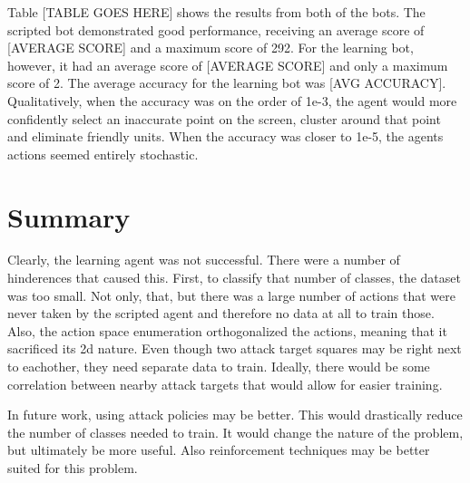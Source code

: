 \documentclass{amsart}
\theoremstyle{definition}
\begin{document}

Table [TABLE GOES HERE] shows the results from both of the bots.
The scripted bot demonstrated good performance, receiving an average score of [AVERAGE SCORE] and a maximum score of 292.
For the learning bot, however, it had an average score of [AVERAGE SCORE] and only a maximum score of 2.
The average accuracy for the learning bot was [AVG ACCURACY].
Qualitatively, when the accuracy was on the order of 1e-3, the agent would more confidently select an inaccurate point on the screen, cluster around that point and eliminate friendly units.
When the accuracy was closer to 1e-5, the agents actions seemed entirely stochastic.









\section{Summary}


Clearly, the learning agent was not successful.
There were a number of hinderences that caused this.
First, to classify that number of classes, the dataset was too small.
Not only, that, but there was a large number of actions that were never taken by the scripted agent and therefore no data at all to train those.
Also, the action space enumeration orthogonalized the actions, meaning that it sacrificed its 2d nature.
Even though two attack target squares may be right next to eachother, they need separate data to train.
Ideally, there would be some correlation between nearby attack targets that would allow for easier training.

In future work, using attack policies may be better.
This would drastically reduce the number of classes needed to train.
It would change the nature  of the problem, but ultimately be more useful.
Also reinforcement techniques may be better suited for this problem.
\end{document}
